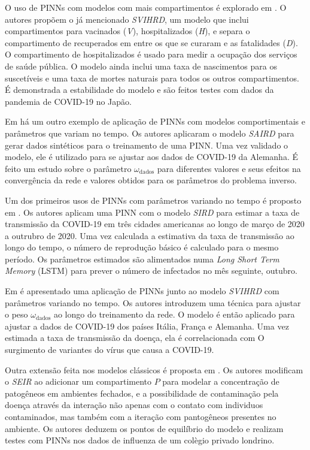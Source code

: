 O uso de PINNs com modelos com mais compartimentos é explorado em \cite{nelson-etal:24-japao}.
O autores propõem o já mencionado \textit{SVIHRD}, um modelo que inclui 
compartimentos para vacinados (\textit{V}), hospitalizados (\textit{H}), 
e separa o compartimento de recuperados em entre os que se curaram e as 
fatalidades (\textit{D}).
O compartimento de hospitalizados é usado para medir a ocupação dos serviços de
saúde pública.
O modelo ainda inclui uma taxa de nascimentos para os 
suscetíveis e uma taxa de mortes naturais para todos os outros compartimentos.
É demonstrada a estabilidade do modelo e são feitos testes com dados da pandemia 
de COVID-19 no Japão.

Em \cite{han-etal:24-prim-artigo-alemanha} há um outro exemplo de aplicação de
PINNs com modelos comportimentais e parâmetros que variam no tempo. Os autores
aplicaram o modelo \textit{SAIRD} para gerar dados sintéticos para 
o treinamento de uma PINN. Uma vez validado o modelo, ele é utilizado para se
ajustar aos dados de COVID-19 da Alemanha. É feito um estudo sobre o
parâmetro $\omega_{\text{dados}}$ para diferentes valores e seus efeitos na 
convergência da rede e valores obtidos para os parâmetros do problema inverso. 

Um dos primeiros usos de PINNs com parâmetros variando no tempo é proposto em 
\cite{long-etal:21-L2}. Os autores aplicam uma PINN com o modelo \textit{SIRD}
para estimar a taxa de transmissão da COVID-19 em três cidades americanas
ao longo de março de 2020 a outrubro de 2020. Uma vez calculada a estimativa da 
taxa de transmissão ao longo do tempo, o número de reprodução básico é calculado
para o mesmo período. 
Os parâmetros estimados são alimentados numa \textit{Long Short Term Memory} 
(LSTM) para prever o número de infectados no mês seguinte, outubro. 

Em \cite{shamsara-etal:25-omicron} é apresentado uma aplicação de PINNs
junto ao modelo \textit{SVIHRD} com parâmetros variando no tempo. 
Os autores introduzem uma técnica para ajustar o peso $\omega_{\text{dados}}$ 
ao longo do treinamento da rede. O modelo é então aplicado
para ajustar a dados de COVID-19 dos países Itália, França e Alemanha. 
Uma vez estimada a taxa de transmissão da doença, ela é correlacionada com O
surgimento de variantes do vírus que causa a COVID-19.

Outra extensão feita nos modelos clássicos é proposta em \cite{nguyen-etal:22-raissi-seirp}.
Os autores modificam o \textit{SEIR} ao adicionar um compartimento $P$ para 
modelar a concentração de patogêneos em ambientes fechados, e a possibilidade
de contaminação pela doença através da interação não apenas com o contato com
individuos contaminados, mas também com a iteração com pantogêneos presentes no
ambiente. Os autores deduzem os pontos de equilíbrio do modelo e 
realizam testes com PINNs nos dados de influenza de um colègio
privado londrino.     

